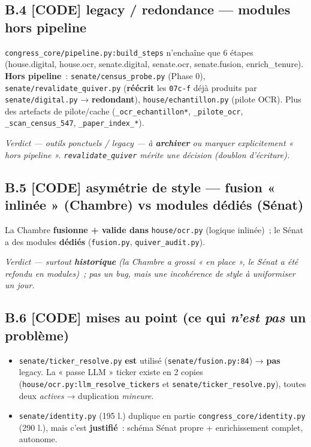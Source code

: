 \documentclass[11pt,a4paper]{article}
\newcommand{\co}[1]{\texttt{\small #1}}
\newcommand{\tagCode}{\textcolor{blue!70!black}{\textbf{[CODE]}}}
\newcommand{\verdict}[1]{\par\smallskip\noindent{\color{coreC}\rule{2pt}{\baselineskip}}\hspace{6pt}\textit{Verdict — #1}\par\smallskip}
\begin{document}
\subsection{B.4 \;\tagCode{} legacy / redondance — modules hors pipeline}
\co{congress_core/pipeline.py:build_steps} n'enchaîne que 6 étapes (house.digital, house.ocr,
senate.digital, senate.ocr, senate.fusion, enrich\_tenure). \textbf{Hors pipeline}~:
\co{senate/census_probe.py} (Phase 0), \co{senate/revalidate_quiver.py} (\textbf{réécrit} les \co{07c-f}
déjà produits par \co{senate/digital.py} → \textbf{redondant}), \co{house/echantillon.py} (pilote OCR).
Plus des artefacts de pilote/cache (\co{_ocr_echantillon*}, \co{_pilote_ocr}, \co{_scan_census_547},
\co{_paper_index_*}). \verdict{outils ponctuels / legacy — à \textbf{archiver} ou marquer explicitement
« hors pipeline ». \co{revalidate_quiver} mérite une décision (doublon d'écriture).}

\subsection{B.5 \;\tagCode{} asymétrie de style — fusion « inlinée » (Chambre) vs modules dédiés (Sénat)}
La Chambre \textbf{fusionne + valide dans} \co{house/ocr.py} (logique inlinée)~; le Sénat a des modules
\textbf{dédiés} (\co{fusion.py}, \co{quiver_audit.py}). \verdict{surtout \textbf{historique} (la Chambre
a grossi « en place », le Sénat a été refondu en modules)~; pas un bug, mais une incohérence de style à
uniformiser un jour.}

\subsection{B.6 \;\tagCode{} mises au point (ce qui \emph{n'est pas} un problème)}
\begin{itemize}[nosep,leftmargin=1.4em]
\item \co{senate/ticker_resolve.py} \textbf{est} utilisé (\co{senate/fusion.py:84}) → \textbf{pas} legacy.
La « passe LLM » ticker existe en 2 copies (\co{house/ocr.py:llm_resolve_tickers} et
\co{senate/ticker_resolve.py}), toutes deux \emph{actives} → duplication \emph{mineure}.
\item \co{senate/identity.py} (195 l.) duplique en partie \co{congress_core/identity.py} (290 l.), mais
c'est \textbf{justifié}~: schéma Sénat propre + enrichissement complet, autonome.
\end{itemize}

\end{document}
